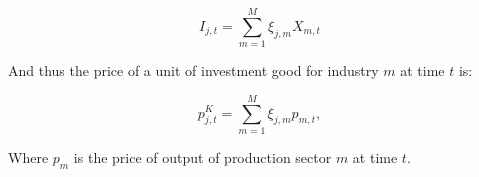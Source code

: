              \begin{equation} \label{eqn:mix_cons}
             I_{j,t} = \sum_{m=1}^{M}\xi_{j,m}X_{m,t} 
    	\end{equation}
	
	And thus the price of a unit of investment good for industry $m$ at time $t$ is:
	
             \begin{equation} \label{eqn:mix_cons_price}
             p^{K}_{j,t} = \sum_{m=1}^{M}\xi_{j,m}p_{m,t}, 
    	\end{equation}
    
    Where $p_{m}$ is the price of output of production sector $m$ at time $t$.



